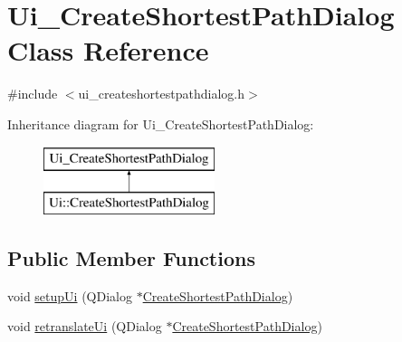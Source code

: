 \hypertarget{class_ui___create_shortest_path_dialog}{}\section{Ui\+\_\+\+Create\+Shortest\+Path\+Dialog Class Reference}
\label{class_ui___create_shortest_path_dialog}


{\ttfamily \#include $<$ui\+\_\+createshortestpathdialog.\+h$>$}

Inheritance diagram for Ui\+\_\+\+Create\+Shortest\+Path\+Dialog\+:\begin{figure}[H]
\begin{center}
\leavevmode
\includegraphics[height=2.000000cm]{d3/ded/class_ui___create_shortest_path_dialog}
\end{center}
\end{figure}
\subsection*{Public Member Functions}
\begin{DoxyCompactItemize}
\item 
void \mbox{\hyperlink{class_ui___create_shortest_path_dialog_a246eba6276056a77430cceba277a09bd}{setup\+Ui}} (Q\+Dialog $\ast$\mbox{\hyperlink{class_create_shortest_path_dialog}{Create\+Shortest\+Path\+Dialog}})
\item 
void \mbox{\hyperlink{class_ui___create_shortest_path_dialog_a0687dd5f557e43cecca4aba0be7eb720}{retranslate\+Ui}} (Q\+Dialog $\ast$\mbox{\hyperlink{class_create_shortest_path_dialog}{Create\+Shortest\+Path\+Dialog}})
\end{DoxyCompactItemize}
